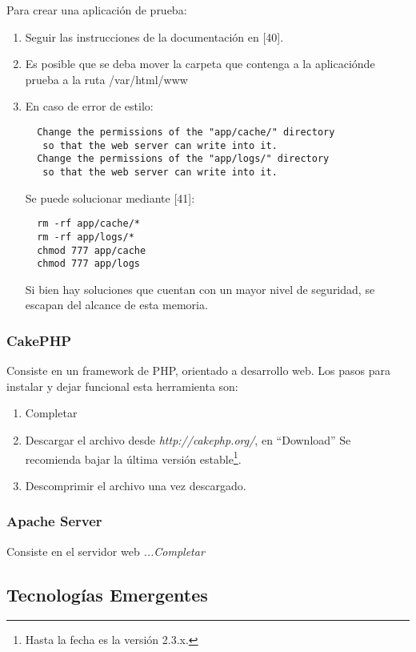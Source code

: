 Para crear una aplicación de prueba:
\begin{enumerate}
 \item Seguir las instrucciones de la documentación en [40].
 \item Es posible que se deba mover la carpeta que contenga a la aplicaciónde prueba a la ruta /var/html/www
 \item En caso de error de estilo:
 \begin{verbatim}
  Change the permissions of the "app/cache/" directory 
   so that the web server can write into it.
  Change the permissions of the "app/logs/" directory 
   so that the web server can write into it.
 \end{verbatim}
 Se puede solucionar mediante [41]:
 \begin{verbatim}
  rm -rf app/cache/*
  rm -rf app/logs/* 
  chmod 777 app/cache
  chmod 777 app/logs
 \end{verbatim}

 Si bien hay soluciones que cuentan con un mayor nivel de seguridad, se escapan del alcance de esta memoria.

\end{enumerate}


\subsubsection{CakePHP}

Consiste en un framework de PHP, orientado a desarrollo web. Los pasos para instalar y dejar funcional esta herramienta son:

\begin{enumerate}
 \item Completar
 \item Descargar el archivo desde \textit{http://cakephp.org/}, en ``Download'' Se recomienda bajar la última versión 
       estable\footnote{Hasta la fecha es la versión 2.3.x.}.
 \item Descomprimir el archivo una vez descargado.%
\end{enumerate}

\subsubsection{Apache Server}

Consiste en el servidor web  \textit{ ...Completar}

\subsection{Tecnologías Emergentes}

